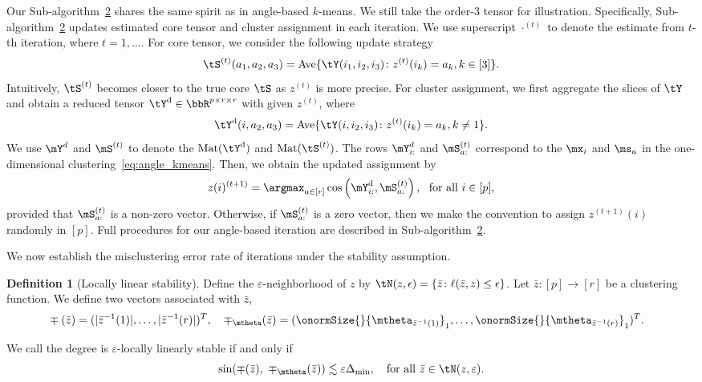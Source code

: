 \documentclass[lettersize,onecolumn,journal]{IEEEtran}
\theoremstyle{definition}
\theoremstyle{definition}
\newtheorem{defn}{Definition}
\newcommand{\of}[1]{\left(#1\right)}
\begin{document}
Our Sub-algorithm~\hyperref[alg:main]{2} shares the same spirit as in angle-based $k$-means. We still take the order-3 tensor for illustration. Specifically, Sub-algorithm~\hyperref[alg:main]{2} updates estimated core tensor and cluster assignment in each iteration. We use superscript $\cdot^{(t)}$ to denote the estimate from $t$-th iteration, where $t=1,\ldots.$ For core tensor, we consider the following update strategy  
 \[
 \tS^{(t)}(a_1,a_2,a_3)=\text{Ave}\{\tY(i_1,i_2,i_3)\colon z^{(t)}(i_k)=a_k, k\in[3]\}.
\]
Intuitively, $\tS^{(t)}$ becomes closer to the true core $\tS$ as $z^{(t)}$ is more precise. For cluster assignment, we first aggregate the slices of $\tY$ and obtain a reduced tensor $\tY^{\text{d}}\in \bbR^{p \times r \times r}$ with given $z^{(t)}$, where
\[
\tY^{\text{d}}(i,a_2,a_3)=\text{Ave}\{\tY(i,i_2,i_3)\colon z^{(t)}(i_k)=a_k, k \neq 1\}.
\]
We use $\mY^d$ and $ \mS^{(t)}$ to denote the $\text{Mat}(\tY^{\text{d}})$ and $\text{Mat}(\tS^{(t)})$. The rows $\mY^d_{i:}$ and $\mS^{(t)}_{a:}$ correspond to the $\mx_i$ and $\ms_a$ in the one-dimensional clustering~\eqref{eq:angle_kmeans}. Then, we obtain the updated assignment by
\[
z(i)^{(t+1)} = \argmax_{a \in [r]} \cos \of{ \mY^{\text{d}}_{i:}, \mS^{(t)}_{a:} },\ \text{ for all } i \in [p],
\]
provided that $\mS^{(t)}_{a:}$ is a non-zero vector. Otherwise, if $\mS^{(t)}_{a:}$ is a zero vector, then we make the convention to assign $z^{(t+1)}(i)$ randomly in $[p]$. Full procedures for our angle-based iteration are described in Sub-algorithm~\hyperref[alg:main]{2}. 

We now establish the misclustering error rate of iterations under the stability assumption.

\begin{defn}[Locally linear stability] \label{def:stable}
Define the $\varepsilon$-neighborhood of $z$ by $\tN(z,\epsilon)=\{\bar z\colon \ell(\bar z, z)\leq \epsilon\}$. Let $\bar z\colon[p]\to [r]$ be a clustering function. We define two vectors associated with $\bar z$,
\begin{align}
    &\mp(\bar z)=(|\bar z^{-1}(1)|, \ldots,|\bar z^{-1}(r)|)^T, \quad \mp_{\mtheta}(\bar z)=(\onormSize{}{\mtheta_{\bar z^{-1}(1)}}_1,\ldots,\onormSize{}{\mtheta_{\bar z^{-1}(r)}}_1)^T.
\end{align}

We call the degree is $\varepsilon$-locally linearly stable if and only if 
\begin{equation}\label{eq:local}
    \sin(\mp(\bar z),\ \mp_{\mtheta}(\bar z))\lesssim \varepsilon \Delta_{\min} ,\quad \text{for all } \bar z\in \tN(z, \varepsilon).
\end{equation}
\end{defn}
\end{document}
